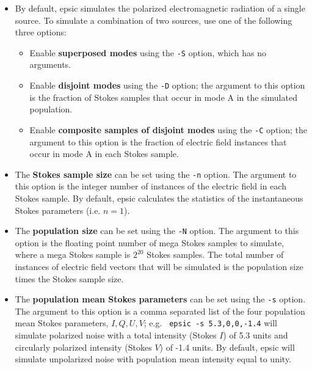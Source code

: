 \documentclass[12pt]{article}
\begin{document}
\begin{itemize}

\item By default, {\sc epsic} simulates the polarized electromagnetic
  radiation of a single source.  To simulate a combination of two
  sources, use one of the following three options:

  \begin{itemize}
  \item Enable {\bf superposed modes} using the {\tt -S} option, which
    has no arguments.

  \item Enable {\bf disjoint modes} using the {\tt -D} option; the argument
    to this option is the fraction of Stokes samples that occur in mode A
    in the simulated population.

  \item Enable {\bf composite samples of disjoint modes} using the
    {\tt -C} option; the argument to this option is the fraction of
    electric field instances that occur in mode A in each Stokes sample.

  \end{itemize}

\item The {\bf Stokes sample size} can be set using the {\tt -n}
  option.  The argument to this option is the integer number of
  instances of the electric field in each Stokes sample.  By default,
  {\sc epsic} calculates the statistics of the instantaneous Stokes
  parameters (i.e. $n=1$).

\item The {\bf population size} can be set using the {\tt -N}
  option.  The argument to this option is the floating point number
  of mega Stokes samples to simulate, where a mega Stokes sample is
  $2^{20}$ Stokes samples.  The total number of instances of electric
  field vectors that will be simulated is the population size times
  the Stokes sample size.
   
\item The {\bf population mean Stokes parameters} can be set using the
  {\tt -s} option. The argument to this option is a comma separated list
  of the four population mean Stokes parameters, $I,Q,U,V$; e.g.  {\tt
    epsic -s 5.3,0,0,-1.4} will simulate polarized noise with a total
  intensity (Stokes $I$) of 5.3 units and circularly polarized
  intensity (Stokes $V$) of -1.4 units.  By default, {\sc epsic} will
  simulate unpolarized noise with population mean
  intensity equal to unity.
  

\end{itemize}
\end{document}
